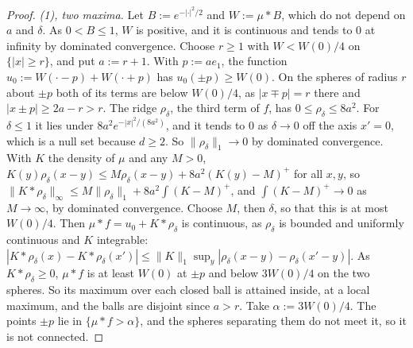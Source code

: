 \begin{proof}
\emph{(1), two maxima.} Let
$B := e^{-|\cdot|^2/2}$ and $W := \mu * B$, which do not depend on $a$
and $\delta$. As $0 < B \le 1$, $W$ is positive, and it is continuous and tends to $0$ at infinity
by dominated convergence. Choose $r \ge 1$ with $W < W(0)/4$ on $\{|x| \ge r\}$, and put
$a := r + 1$. With $p := ae_1$, the function $u_0 := W(\cdot - p) + W(\cdot + p)$ has
$u_0(\pm p) \ge W(0)$. On the spheres of radius $r$ about $\pm p$ both of its terms are below
$W(0)/4$, as $|x \mp p| = r$ there and $|x \pm p| \ge 2a - r > r$. The
ridge $\rho_\delta$, the third term of $f$, has $0 \le \rho_\delta \le 8a^2$. For $\delta \le 1$ it
lies under $8a^2e^{-|x|^2/(8a^2)}$, and it tends to $0$ as $\delta \to 0$ off the axis $x' = 0$,
which is a null set because $d \ge 2$. So $\|\rho_\delta\|_1 \to 0$ by dominated convergence. With
$K$ the density of $\mu$ and any $M > 0$, $K(y)\rho_\delta(x - y) \le M\rho_\delta(x - y) + 8a^2(K(y) - M)^+$ for all $x, y$, so $\|K * \rho_\delta\|_\infty \le M\|\rho_\delta\|_1 + 8a^2\int(K - M)^+$, and
$\int(K - M)^+ \to 0$ as $M \to \infty$, by dominated convergence. Choose $M$, then $\delta$, so
that this is at most $W(0)/4$. Then $\mu * f = u_0 + K * \rho_\delta$ is continuous, as $\rho_\delta$ is
bounded and uniformly continuous and $K$ integrable:
$|K * \rho_\delta(x) - K * \rho_\delta(x')| \le \|K\|_1\sup_y|\rho_\delta(x - y) - \rho_\delta(x' - y)|$.
As $K * \rho_\delta \ge 0$, $\mu * f$ is at least $W(0)$ at $\pm p$ and below $3W(0)/4$ on the
two spheres. So its maximum over each closed ball is attained inside, at a local maximum, and the
balls are disjoint since $a > r$. Take $\alpha := 3W(0)/4$. The points $\pm p$ lie in
$\{\mu * f > \alpha\}$, and the spheres separating them do not meet it, so it is not connected.


\end{proof}
